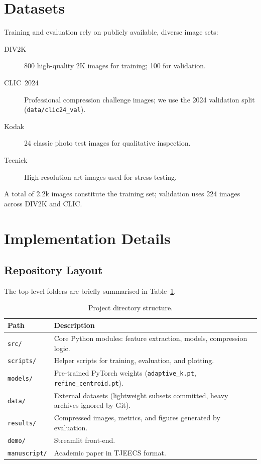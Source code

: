 \documentclass[11pt]{article}
\begin{document}
\section{Datasets}
Training and evaluation rely on publicly available, diverse image sets:
\begin{description}
  \item[DIV2K~\cite{Agustsson_2017_CVPR_Workshops}] 800 high-quality 2K images for training; 100 for validation.
  \item[CLIC~2024] Professional compression challenge images; we use the 2024 validation split (\texttt{data/clic24\_val}).
  \item[Kodak] 24 classic photo test images for qualitative inspection.
  \item[Tecnick] High-resolution art images used for stress testing.
\end{description}
A total of 2.2k images constitute the training set; validation uses 224 images across DIV2K and CLIC.

\section{Implementation Details}
\subsection{Repository Layout}
The top-level folders are briefly summarised in Table~\ref{tab:layout}.

\begin{table}[H]
  \centering
  \begin{tabular}{lp{8cm}}
    \textbf{Path} & \textbf{Description} \\\hline
    \texttt{src/} & Core Python modules: feature extraction, models, compression logic.\\
    \texttt{scripts/} & Helper scripts for training, evaluation, and plotting.\\
    \texttt{models/} & Pre-trained PyTorch weights (\texttt{adaptive\_k.pt}, \texttt{refine\_centroid.pt}).\\
    \texttt{data/} & External datasets (lightweight subsets committed, heavy archives ignored by Git).\\
    \texttt{results/} & Compressed images, metrics, and figures generated by evaluation.\\
    \texttt{demo/} & Streamlit front-end.\\
    \texttt{manuscript/} & Academic paper in TJEECS format.\\
  \end{tabular}
  \caption{Project directory structure.}
  \label{tab:layout}
\end{table}
\end{document}
